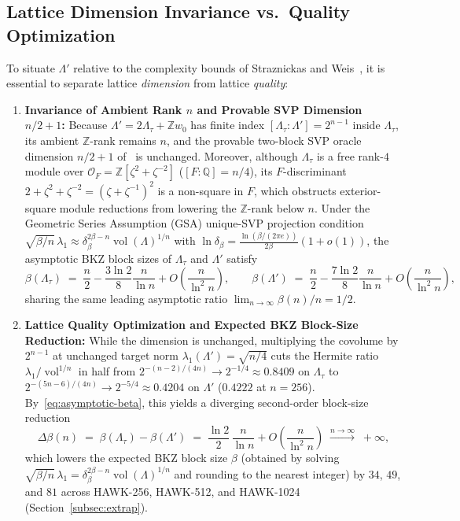 \documentclass[11pt,a4paper]{article}
\theoremstyle{definition}
\newcommand{\Z}{\mathbb{Z}}
\newcommand{\Q}{\mathbb{Q}}
\newcommand{\Lt}{\Lambda_\tau}
\newcommand{\Lp}{\Lambda'}
\newcommand{\vol}{\operatorname{vol}}
\begin{document}
\subsection{Lattice Dimension Invariance vs.\ Quality Optimization}
\label{subsec:dim-vs-quality}
To situate $\Lp$ relative to the complexity bounds of Straznickas and Weis~\cite{SW26}, it is essential to separate lattice \emph{dimension} from lattice \emph{quality}:
\begin{enumerate}[leftmargin=*]
\item \textbf{Invariance of Ambient Rank $n$ and Provable SVP Dimension $n/2+1$:}
Because $\Lp = 2\Lt + \Z w_0$ has finite index $[\Lt : \Lp] = 2^{n-1}$ inside $\Lt$, its ambient $\Z$-rank remains $n$, and the provable two-block SVP oracle dimension $n/2 + 1$ of~\cite{Duc23,SW26} is unchanged. Moreover, although $\Lt$ is a free rank-$4$ module over $\mathcal{O}_F = \Z[\zeta^2+\zeta^{-2}]$ ($[F:\Q]=n/4$), its $F$-discriminant $2 + \zeta^2 + \zeta^{-2} = (\zeta + \zeta^{-1})^2$ is a non-square in $F$, which obstructs exterior-square module reductions from lowering the $\Z$-rank below $n$. Under the Geometric Series Assumption (GSA) unique-SVP projection condition~\cite{AD21} $\sqrt{\beta/n}\,\lambda_1 \approx \delta_\beta^{2\beta - n}\vol(\Lambda)^{1/n}$ with $\ln \delta_\beta = \frac{\ln(\beta/(2\pi e))}{2\beta}(1 + o(1))$, the asymptotic BKZ block sizes of $\Lt$ and $\Lp$ satisfy
\begin{equation}\label{eq:asymptotic-beta}
  \beta(\Lt) \;=\; \frac{n}{2} - \frac{3\ln 2}{8}\frac{n}{\ln n} + O\!\left(\frac{n}{\ln^2 n}\right),
  \qquad
  \beta(\Lp) \;=\; \frac{n}{2} - \frac{7\ln 2}{8}\frac{n}{\ln n} + O\!\left(\frac{n}{\ln^2 n}\right),
\end{equation}
sharing the same leading asymptotic ratio $\lim_{n\to\infty} \beta(n)/n = 1/2$.
\item \textbf{Lattice Quality Optimization and Expected BKZ Block-Size Reduction:}
While the dimension is unchanged, multiplying the covolume by $2^{n-1}$ at unchanged target norm $\lambda_1(\Lp) = \sqrt{n/4}$ cuts the Hermite ratio $\lambda_1/\vol^{1/n}$ in half from $2^{-(n-2)/(4n)} \to 2^{-1/4} \approx 0.8409$ on $\Lt$ to $2^{-(5n-6)/(4n)} \to 2^{-5/4} \approx 0.4204$ on $\Lp$ ($0.4222$ at $n=256$). By~\eqref{eq:asymptotic-beta}, this yields a diverging second-order block-size reduction
\[
  \Delta\beta(n) \;=\; \beta(\Lt) - \beta(\Lp) \;=\; \frac{\ln 2}{2}\,\frac{n}{\ln n} + O\!\left(\frac{n}{\ln^2 n}\right) \;\xrightarrow{n\to\infty}\; +\infty,
\]
which lowers the expected BKZ block size $\beta$ (obtained by solving $\sqrt{\beta/n}\,\lambda_1 = \delta_\beta^{2\beta - n}\vol(\Lambda)^{1/n}$ and rounding to the nearest integer) by $34$, $49$, and $81$ across HAWK-256, HAWK-512, and HAWK-1024 (Section~\ref{subsec:extrap}).
\end{enumerate}
\end{document}
